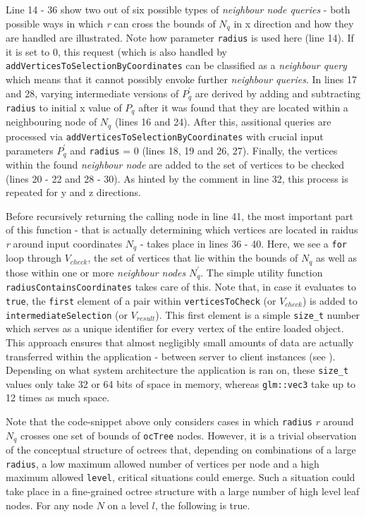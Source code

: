 Line 14 - 36 show two out of six possible types of \textit{neighbour node queries} - both possible ways in which \textit{r} can cross the bounds of $N_q$ in x direction and how they are handled are illustrated. Note how parameter \texttt{radius} is used here (line 14). If it is set to 0, this request (which is also handled by \texttt{addVerticesToSelectionByCoordinates} can be classified as a \textit{neighbour query} which means that it cannot possibly envoke further \textit{neighbour queries}. In lines 17 and 28, varying intermediate versions of $P_{q}^{'}$ are derived by adding and subtracting \texttt{radius} to initial x value of $P_{q}$ after it was found that they are located within a neighbouring node of $N_q$ (lines 16 and 24). After this, assitional queries are processed via \texttt{addVerticesToSelectionByCoordinates} with crucial input parameters $P_{q}^{'}$ and \texttt{radius} = 0 (lines 18, 19 and 26, 27). Finally, the vertices within the found \textit{neighbour node} are added to the set of vertices to be checked (lines 20 - 22 and 28 - 30). As hinted by the comment in line 32, this process is repeated for y and z directions.

Before recursively returning the calling node in line 41, the most important part of this function - that is actually determining which vertices are located in raidus \textit{r} around input coordinates $N_q$ - takes place in lines 36 - 40. Here, we see a \texttt{for} loop through $V_{check}$, the set of vertices that lie within the bounds of $N_q$ as well as those within one or more \textit{neighbour nodes} $N_q^{'}$. The simple utility function \texttt{radiusContainsCoordinates} takes care of this. Note that, in case it evaluates to \texttt{true}, the \texttt{first} element of a pair within \texttt{verticesToCheck} (or $V_{check}$) is added to \texttt{intermediateSelection} (or $V_{result}$). This first element is a simple \texttt{size\_t} number which serves as a unique identifier for every vertex of the entire loaded object. This approach ensures that almost negligibly small amounts of data are actually transferred within the application - between server to client instances (see
). Depending on what system architecture the application is ran on, these \texttt{size\_t} values only take 32 or 64 bits of space in memory, whereas \texttt{glm::vec3} take up to 12 times as much space.

Note that the code-snippet above only considers cases in which \texttt{radius} $r$ around $N_q$ crosses one set of bounds of \texttt{ocTree} nodes. However, it is a trivial observation of the conceptual structure of octrees that, depending on combinations of a large \texttt{radius}, a low maximum allowed number of vertices per node and a high maximum allowed \texttt{level}, critical situations could emerge. Such a situation could take place in a fine-grained octree structure with a large number of high level leaf nodes. For any node $N$ on a level $l$, the following is true.

